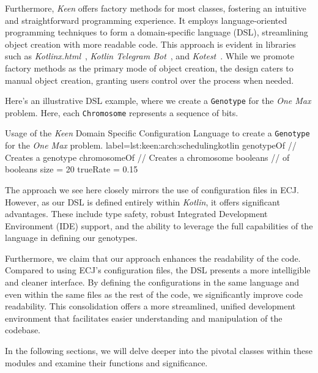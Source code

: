   Furthermore, \textit{Keen} offers factory methods for most classes, fostering an intuitive and straightforward programming experience. It employs language-oriented programming techniques to form a domain-specific language (DSL), streamlining object creation with more readable code. This approach is evident in libraries such as 
  \textit{Kotlinx.html}~\autocite{KotlinxHtml2023}, \textit{Kotlin Telegram Bot}~\autocite{KotlinTelegramBot2023}, and \textit{Kotest}~\autocite{KotestKotesta}. While we promote factory methods as the primary mode of object creation, the design caters to manual object creation, granting users control over the process when needed.


  Here's an illustrative DSL example, where we create a \texttt{Genotype} for the \textit{One Max} problem. Here, each \texttt{Chromosome} represents a sequence of bits.

  \begin{code}{
      Usage of the \textit{Keen} Domain Specific Configuration Language to create a \texttt{Genotype} for the 
      \textit{One Max} problem.
  }{label={lst:keen:arch:scheduling}}{kotlin}
    genotypeOf {        // Creates a genotype
        chromosomeOf {  // Creates a chromosome
            booleans {  // of booleans
                size = 20
                trueRate = 0.15
            }
        }
    }
  \end{code}

  The approach we see here closely mirrors the use of configuration files in ECJ. However, as our DSL is defined entirely within \textit{Kotlin}, it offers significant advantages. These include type safety, robust Integrated Development Environment (IDE) support, and the ability to leverage the full capabilities of the language in defining our genotypes.
  
  Furthermore, we claim that our approach enhances the readability of the code. Compared to using ECJ's configuration files, the DSL presents a more intelligible and cleaner interface.
  By defining the configurations in the same language and even within the same files as the rest of the code, we significantly improve code readability.
  This consolidation offers a more streamlined, unified development environment that facilitates easier understanding and manipulation of the codebase.

  In the following sections, we will delve deeper into the pivotal classes within these modules and examine their functions and significance.
